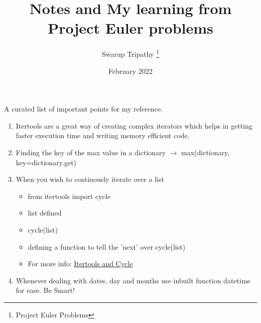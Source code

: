 \documentclass[11pt]{article}
\title{Notes and My learning from Project Euler problems}
\author{Swarup Tripathy \thanks{Project Euler Problems}}
\date{February 2022}
\begin{document}
    \maketitle
    A curated list of important points for my reference.\\
    \begin{enumerate}
        \item Itertools are a great way of creating complex iterators which helps in getting faster execution time and writing memory efficient code.
        \item Finding the key of the max value in a dictionary $\rightarrow$ max(dictionary, key=dictionary.get)
        \item When you wish to continously iterate over a list 
        \begin{itemize}
            \item from itertools import cycle
            \item list defined
            \item cycle(list)
            \item defining a function to tell the 'next' over cycle(list)
            \item For more info: \href{https://medium.com/@masnun/infinitely-cycling-through-a-list-in-python-ef37e9df100}{Itertools and Cycle}
        \end{itemize}
        \item Whenever dealing with dates, day and months use inbuilt function datetime for ease. Be Smart!
    \end{enumerate}
\end{document}
